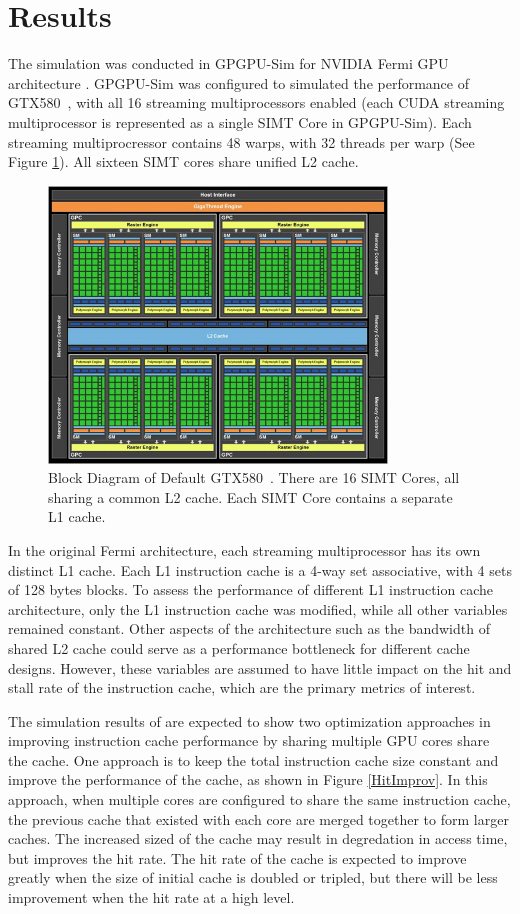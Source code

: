 \section{Results}

The simulation was conducted in GPGPU-Sim for NVIDIA Fermi GPU
architecture \cite{bakhodayuan09}. 
GPGPU-Sim was configured to simulated the performance of
GTX580~\cite{gf100}, with all 16 streaming multiprocessors enabled
(each CUDA streaming multiprocessor is represented as a single SIMT
Core in GPGPU-Sim). 
Each streaming multiprocressor contains 48 warps, with 32 threads per
warp (See Figure \ref{GTX580}). 
All sixteen SIMT cores share unified L2 cache.

\begin{figure}[ht!]
\centering
\includegraphics[width=90mm]{graphics/GTX580.jpg}
\caption{Block Diagram of Default GTX580~\cite{gf100}. There are 16 SIMT Cores, all sharing a common L2 cache. Each SIMT Core contains a separate L1 cache.}
\label{GTX580}
\end{figure}

In the original Fermi architecture, each streaming multiprocessor has
its own distinct L1 cache. 
Each L1 instruction cache is a 4-way set associative, with 4 sets of
128 bytes blocks. 
To assess the  performance of different L1 instruction cache
architecture, only the L1 instruction cache was modified, while all
other variables remained constant. 
Other aspects of the architecture such as the bandwidth of shared L2
cache could serve as a performance bottleneck for different cache
designs. 
However, these variables are assumed to have little impact on the hit
and stall rate of the instruction cache, which are the primary metrics
of interest.

The simulation results of are expected to show two optimization
approaches in improving instruction cache performance by sharing
multiple GPU cores share the cache. 
One approach is to keep the total instruction cache size constant and
improve the performance of the cache, as shown in Figure
\ref{HitImprov}. 
In this approach, when multiple cores are configured to share the same
instruction cache, the previous cache that existed with each core are
merged together to form larger caches. 
The increased sized of the cache may result in degredation in access
time, but improves the hit rate. 
The hit rate of the cache is expected to improve greatly when the size
of initial cache is doubled or tripled, but there will be less
improvement when the hit rate at a high level.


